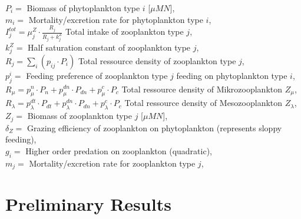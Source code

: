 \noindent
\mbox{} \hspace{0 cm} $P_i=$ Biomass of phytoplankton type $i$ [$\mu M N$],\\
\mbox{} \hspace{0 cm} $m_i=$ Mortality/excretion rate for phytoplankton type $i$,\\
\noindent
\mbox{} \hspace{0 cm} $I^{tot}_j= \mu^{Z}_j \cdot \frac{R_{j}}{R_{j} + k^Z_j}$ Total intake of zooplankton type $j$,\\
\mbox{} \hspace{0 cm} $k^Z_j =$ Half saturation constant of zooplankton type $j$,\\
\mbox{} \hspace{0 cm} $R_{j}= \sum_{i} (p_{i j} \cdot P_{i})$ Total ressource density of zooplankton type $j$,\\
\mbox{} \hspace{0 cm} $p^i_{j}=$ Feeding preference of zooplankton type $j$ feeding on phytoplankton type $i$,\\
\mbox{} \hspace{0 cm} $R_{\mu}= p^n_{\mu} \cdot P_{n} + p^{dn}_{\mu} \cdot P_{dn} + p^c_{\mu} \cdot P_{c}$ Total ressource density of Mikrozooplankton $Z_{\mu}$,\\
\mbox{} \hspace{0 cm} $R_{\lambda}= p^{dt}_{\lambda} \cdot P_{dt} + p^{dn}_{\lambda} \cdot P_{dn} + p^c_{\lambda} \cdot P_{c}$ Total ressource density of Mesozooplankton $Z_{\lambda}$,\\


\noindent
\mbox{} \hspace{0 cm} $Z_j=$ Biomass of zooplankton type $j$ [$\mu M N$],\\
\mbox{} \hspace{0 cm} $\delta_{Z}=$ Grazing efficiency of zooplankton on phytoplankton (represents sloppy feeding), \\
\mbox{} \hspace{0 cm} $g_{i}=$ Higher order predation on zooplankton (quadratic), \\
\mbox{} \hspace{0 cm} $m_{j}=$ Mortality/excretion rate for zooplankton type $j$,\\

\section{Preliminary Results}


